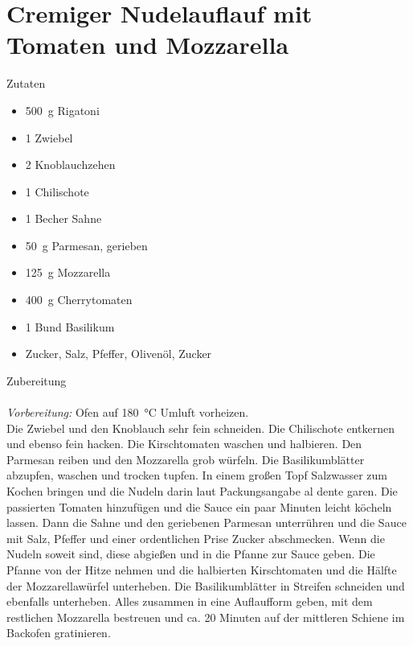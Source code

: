 \section*{Cremiger Nudelauflauf mit Tomaten und Mozzarella}
\ihead{}\ohead{}
\cfoot{}
{\Large Zutaten}
\begin{multicols}{2}
\begin{itemize}
    \item \SI{500}{g} Rigatoni
    \item \num{1} Zwiebel
    \item \num{2} Knoblauchzehen
    \item \num{1} Chilischote
    \item \num{1} Becher Sahne
    \item \SI{50}{g} Parmesan, gerieben
    \item \SI{125}{g} Mozzarella
    \item \SI{400}{g} Cherrytomaten
    \item \num{1} Bund Basilikum
    \item Zucker, Salz, Pfeffer, Olivenöl, Zucker
\end{itemize}
\end{multicols}
\noindent
{\Large Zubereitung}\\
\\
\textit{Vorbereitung:} Ofen auf \SI{180}{\celsius} Umluft vorheizen.\\
Die Zwiebel und den Knoblauch sehr fein schneiden.
Die Chilischote entkernen und ebenso fein hacken.
Die Kirschtomaten waschen und halbieren.
Den Parmesan reiben und den Mozzarella grob würfeln.
Die Basilikumblätter abzupfen, waschen und trocken tupfen.
In einem großen Topf Salzwasser zum Kochen bringen und die Nudeln darin laut Packungsangabe al dente garen.
Die passierten Tomaten hinzufügen und die Sauce ein paar Minuten leicht köcheln lassen.
Dann die Sahne und den geriebenen Parmesan unterrühren und die Sauce mit Salz, Pfeffer und einer ordentlichen Prise Zucker abschmecken. 
Wenn die Nudeln soweit sind, diese abgießen und in die Pfanne zur Sauce geben.
Die Pfanne von der Hitze nehmen und die halbierten Kirschtomaten und die Hälfte der Mozzarellawürfel unterheben.
Die Basilikumblätter in Streifen schneiden und ebenfalls unterheben.
Alles zusammen in eine Auflaufform geben, mit dem restlichen Mozzarella bestreuen und ca. 20 Minuten auf der mittleren Schiene im Backofen gratinieren.
